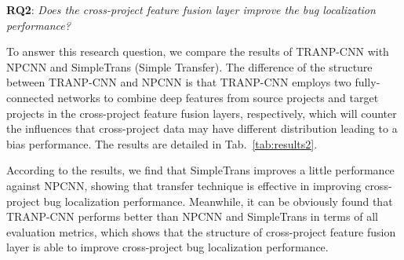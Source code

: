 \textbf{RQ2}: \textit{Does the cross-project feature fusion layer improve the bug localization performance?}

To answer this research question, we compare the results of TRANP-CNN with NPCNN and SimpleTrans (Simple Transfer). The difference of the structure between TRANP-CNN and NPCNN is that TRANP-CNN employs two fully-connected networks to combine deep features from source projects and target projects in the cross-project feature fusion layers, respectively, which will counter the influences that cross-project data may have different distribution leading to a bias performance. The results are detailed in Tab.~\ref{tab:results2}.

According to the results, we find that SimpleTrans improves a little performance against NPCNN, showing that transfer technique is effective in improving cross-project bug localization performance. Meanwhile, it can be obviously found that TRANP-CNN performs better than NPCNN and SimpleTrans in terms of all evaluation metrics, which shows that the structure of cross-project feature fusion layer is able to improve cross-project bug localization performance.

